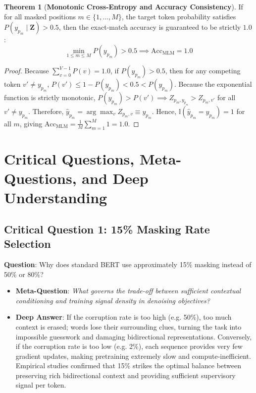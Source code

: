 \documentclass[11pt,a4paper]{article}
\theoremstyle{definition}
\newtheorem{theorem}{\textbf{Theorem}}[section]
\begin{document}
\begin{theorem}[\textbf{Monotonic Cross-Entropy and Accuracy Consistency}]
If for all masked positions $m \in \{1, \dots, M\}$, the target token probability satisfies $P(y_{p_m} \mid \mathbf{Z}) > 0.5$, then the exact-match accuracy is guaranteed to be strictly $1.0$:
{\boldmath
\begin{equation}
\min_{1 \le m \le M} P(y_{p_m}) > 0.5 \implies \text{Acc}_{\text{MLM}} = 1.0
\end{equation}
}
\end{theorem}

\begin{proof}
Because $\sum_{v=0}^{V-1} P(v) = 1.0$, if $P(y_{p_m}) > 0.5$, then for any competing token $v' \ne y_{p_m}$, $P(v') \le 1 - P(y_{p_m}) < 0.5 < P(y_{p_m})$.
Because the exponential function is strictly monotonic, $P(y_{p_m}) > P(v') \implies Z_{p_m, y_{p_m}} > Z_{p_m, v'}$ for all $v' \ne y_{p_m}$.
Therefore, $\hat{y}_{p_m} = \arg\max_v Z_{p_m, v} \equiv y_{p_m}$.
Hence, $\mathbb{I}(\hat{y}_{p_m} = y_{p_m}) = 1$ for all $m$, giving $\text{Acc}_{\text{MLM}} = \frac{1}{M}\sum_{m=1}^M 1 = 1.0$.
\end{proof}

\section{Critical Questions, Meta-Questions, and Deep Understanding}

\subsection{\textbf{Critical Question 1: 15\% Masking Rate Selection}}
\textbf{Question}: Why does standard BERT use approximately 15\% masking instead of 50\% or 80\%?
\begin{itemize}
    \item \textbf{Meta-Question}: \emph{What governs the trade-off between sufficient contextual conditioning and training signal density in denoising objectives?}
    \item \textbf{Deep Answer}: If the corruption rate is too high (e.g. 50\%), too much context is erased; words lose their surrounding clues, turning the task into impossible guesswork and damaging bidirectional representations. Conversely, if the corruption rate is too low (e.g. 2\%), each sequence provides very few gradient updates, making pretraining extremely slow and compute-inefficient. Empirical studies confirmed that 15\% strikes the optimal balance between preserving rich bidirectional context and providing sufficient supervisory signal per token.
\end{itemize}
\end{document}
